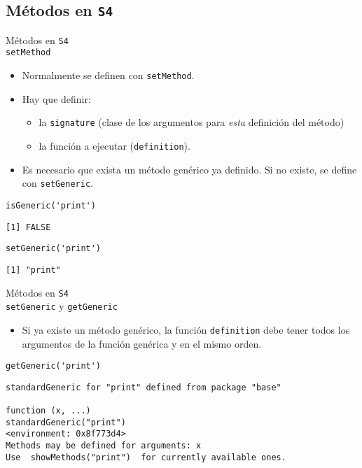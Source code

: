 \documentclass[xcolor={usenames,svgnames,dvipsnames}]{beamer}
\begin{document}
\subsection{Métodos en \texttt{S4}}
\label{sec-3-2}

\begin{frame}[fragile,label=sec-3-2-1]{Métodos en \texttt{S4} \\ \texttt{setMethod}}
 \begin{itemize}
\item Normalmente se definen con \texttt{setMethod}.
\item Hay que definir:
\begin{itemize}
\item la \texttt{signature} (clase de los argumentos para \emph{esta} definición del
método)
\item la función a ejecutar (\texttt{definition}).
\end{itemize}
\item Es necesario que exista un método genérico ya definido. Si no
existe, se define con \texttt{setGeneric}.
\end{itemize}
\lstset{language=R,numbers=none}
\begin{lstlisting}
isGeneric('print')
\end{lstlisting}

\begin{verbatim}
[1] FALSE
\end{verbatim}

\lstset{language=R,numbers=none}
\begin{lstlisting}
setGeneric('print')
\end{lstlisting}

\begin{verbatim}
[1] "print"
\end{verbatim}
\end{frame}
\begin{frame}[fragile,label=sec-3-2-2]{Métodos en \texttt{S4} \\ \texttt{setGeneric} y \texttt{getGeneric}}
 \begin{itemize}
\item Si ya existe un método genérico, la función \texttt{definition} debe tener
todos los argumentos de la función genérica y en el mismo orden.
\end{itemize}
\lstset{language=R,numbers=none}
\begin{lstlisting}
getGeneric('print')
\end{lstlisting}

\begin{verbatim}
standardGeneric for "print" defined from package "base"

function (x, ...) 
standardGeneric("print")
<environment: 0x8f773d4>
Methods may be defined for arguments: x
Use  showMethods("print")  for currently available ones.
\end{verbatim}
\end{frame}
\end{document}
